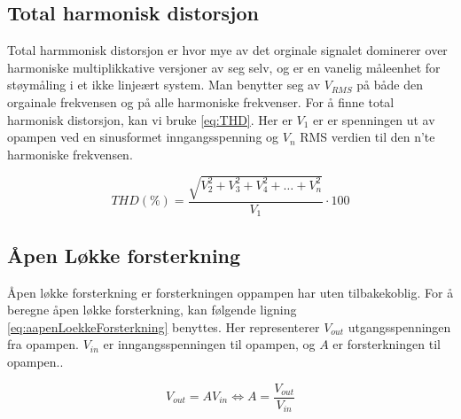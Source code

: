 \subsection{Total harmonisk distorsjon}
\label{totalHarmoniskDistorsjon}

Total harmmonisk distorsjon er hvor mye av det orginale signalet dominerer over harmoniske multiplikkative versjoner av seg selv, og er en vanelig måleenhet for støymåling i et ikke linjeært system. Man benytter seg av $V_{RMS}$ på både den orgainale frekvensen og på alle harmoniske frekvenser. For å finne total harmonisk distorsjon, kan vi bruke \autoref{eq:THD}. Her er $V_{1}$ er er spenningen ut av opampen ved en sinusformet inngangsspenning og $V_n$ RMS verdien til den n'te harmoniske frekvensen.

\begin{equation}
    THD(\%) = \frac {\sqrt {V_2^2 + V_3^2 +V_4^2 + \ldots + V_n^2}}{V_1} \cdot 100
    \label{eq:THD}
\end{equation}





\subsection{Åpen Løkke forsterkning}
\label{aapenLoekkeForsterkning}

Åpen løkke forsterkning er forsterkningen oppampen har uten tilbakekoblig. For å beregne åpen løkke forsterkning, kan følgende ligning \autoref{eq:aapenLoekkeForsterkning} benyttes. Her representerer $V_{out}$ utgangsspenningen fra opampen. $V_{in}$ er inngangsspenningen til opampen, og $A$ er forsterkningen til opampen.\cite{Electronics}.

\begin{equation}
    V_{out} = AV_{in}   \Leftrightarrow   A = \frac{V_{out}}{V_{in}}
    \label{eq:aapenLoekkeForsterkning}
\end{equation}


